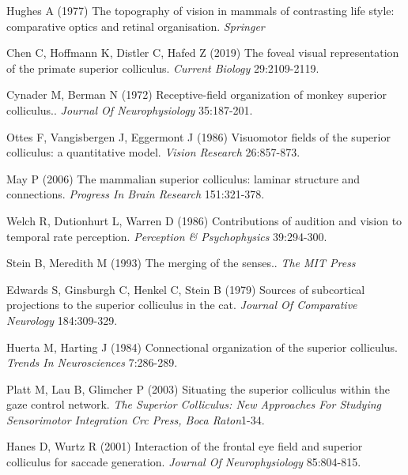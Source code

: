 \documentclass{ar-1col}
\begin{document}
{\begin{thebibliography}{00}
Hughes A (1977) 
The topography of vision in mammals of contrasting life style: comparative optics and retinal organisation.
\textit{ Springer}

Chen C, Hoffmann K, Distler C, Hafed Z (2019) 
The foveal visual representation of the primate superior colliculus.
\textit{ Current Biology} 29:2109-2119.

Cynader M, Berman N (1972) 
Receptive-field organization of monkey superior colliculus..
\textit{ Journal Of Neurophysiology} 35:187-201.

Ottes F, Vangisbergen J, Eggermont J (1986) 
Visuomotor fields of the superior colliculus: a quantitative model.
\textit{ Vision Research} 26:857-873.

May P (2006) 
The mammalian superior colliculus: laminar structure and connections.
\textit{ Progress In Brain Research} 151:321-378.

Welch R, Dutionhurt L, Warren D (1986) 
Contributions of audition and vision to temporal rate perception.
\textit{ Perception \& Psychophysics} 39:294-300.

Stein B, Meredith M (1993) 
The merging of the senses..
\textit{ The MIT Press}

Edwards S, Ginsburgh C, Henkel C, Stein B (1979) 
Sources of subcortical projections to the superior colliculus in the cat.
\textit{ Journal Of Comparative Neurology} 184:309-329.

Huerta M, Harting J (1984) 
Connectional organization of the superior colliculus.
\textit{ Trends In Neurosciences} 7:286-289.

Platt M, Lau B, Glimcher P (2003) 
Situating the superior colliculus within the gaze control network.
\textit{ The Superior Colliculus: New Approaches For Studying Sensorimotor Integration Crc Press, Boca Raton}1-34.

Hanes D, Wurtz R (2001) 
Interaction of the frontal eye field and superior colliculus for saccade generation.
\textit{ Journal Of Neurophysiology} 85:804-815.


\end{thebibliography}}
\end{document}
